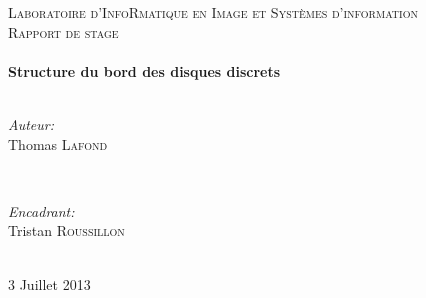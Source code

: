 \documentclass[12pt]{article} %
\begin{document}
\begin{titlepage}

\center %

\textsc{\LARGE Laboratoire d'InfoRmatique en Image et Syst\`{e}mes d'information}\\[1.5cm] %
\textsc{\large Rapport de stage}\\[0.5cm] %

\HRule \\[0.4cm]
{ \huge \bfseries Structure du bord des disques discrets}\\[0.4cm] %
\HRule \\[1.5cm]

\begin{minipage}{0.4\textwidth}
\begin{flushleft} \large
\emph{Auteur:}\\
Thomas \textsc{Lafond} %
\end{flushleft}
\end{minipage}
~
\begin{minipage}{0.4\textwidth}
\begin{flushright} \large
\emph{Encadrant:} \\
Tristan \textsc{Roussillon} %
\end{flushright}
\end{minipage}\\[4cm]

{\large 3 Juillet 2013}\\[3cm] %


\vfill %

\end{titlepage}


\tableofcontents %
\newpage %
\end{document}
